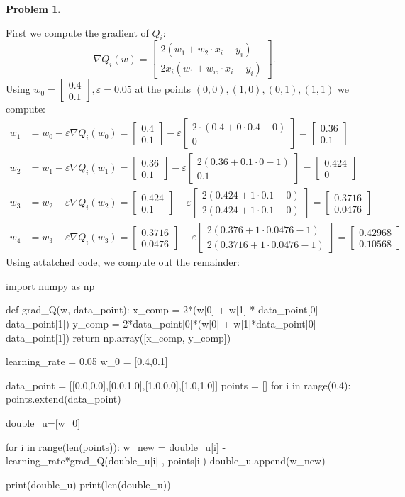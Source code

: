 \documentclass[12pt, a4paper]{article}
\title{}
\author{A.N.}
\date{\today}
\newtheorem{problem}{Problem}
\theoremstyle{definition}
\newcommand{\grad}{\nabla}
\newcommand{\ep}{\varepsilon}
\newcommand{\bmat}[1]{\begin{bmatrix}#1\end{bmatrix}}
\begin{document}
	
	
	
	\begin{problem}
	\end{problem}
	First we compute the gradient of $Q_i$: 
	$$ \grad Q_i(w) = \bmat{2(w_1 + w_2 \cdot x_i - y_i ) \\ 2x_i(w_1 + w_w \cdot x_i - y_i)} .$$
	Using $w_0 = \bmat{0.4 \\ 0.1}, \ep = 0.05$ at the points $(0,0),(1,0), (0,1), (1,1) $ we compute: 
	\begin{align*}
		w_1 & = w_0 - \ep\grad Q_i(w_0) = \bmat{0.4 \\ 0.1} - \ep \bmat{ 2 \cdot (0.4+ 0 \cdot 0.4 - 0) \\ 0} = \bmat{0.36 \\ 0.1} 
		\\ w_2 & = w_1 - \ep \grad Q_i ( w_1) = \bmat{0.36 \\ 0.1 } - \ep \bmat{2(0.36 + 0.1 \cdot 0 - 1) \\ 0.1}  = \bmat{0.424 \\ 0}
		\\ w_3 & = w_2 -\ep \grad Q_i (w_2) = \bmat{0.424 \\ 0.1 } - \ep \bmat{2 ( 0.424 + 1 \cdot 0.1 - 0) \\ 2(0.424 + 1 \cdot 0.1 - 0)} = \bmat{0.3716 \\ 0.0476}
		\\ w_4 & = w_3 - \ep \grad Q_i (w_3)  = \bmat{0.3716 \\ 0.0476} - \ep \bmat{2 (0.376 + 1 \cdot 0.0476  - 1) \\ 2 (0.3716 + 1 \cdot 0.0476 - 1)} = \bmat{0.42968 \\ 0.10568}
	\end{align*}
	Using attatched code, we compute out the remainder: 
	\begin{python}
		import numpy as np
		
		def grad_Q(w, data_point):
		x_comp = 2*(w[0] + w[1] * data_point[0] - data_point[1])
		y_comp = 2*data_point[0]*(w[0] + w[1]*data_point[0] - data_point[1])
		return np.array([x_comp, y_comp])
		
		learning_rate = 0.05
		w_0 = [0.4,0.1]
		
		data_point = [[0.0,0.0],[0.0,1.0],[1.0,0.0],[1.0,1.0]]
		points = []
		for i in range(0,4):
		points.extend(data_point)
		
		double_u=[w_0]
		
		for i in range(len(points)):
		w_new = double_u[i] - learning_rate*grad_Q(double_u[i] , points[i])
		double_u.append(w_new)
		
		print(double_u)
		print(len(double_u))
	\end{python}
\end{document}
